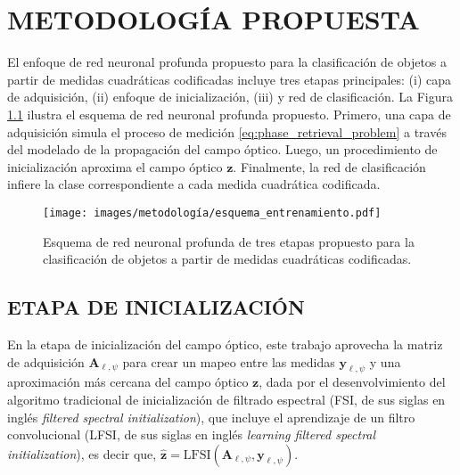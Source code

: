 
\chapter{METODOLOGÍA PROPUESTA}

El enfoque de red neuronal profunda propuesto para la clasificación de objetos a partir de medidas cuadráticas codificadas incluye tres etapas principales: (i) capa de adquisición, (ii) enfoque de inicialización, (iii) y red de clasificación. La Figura \ref{fig:esquema_entrenamiento} ilustra el esquema de red neuronal profunda propuesto. Primero, una capa de adquisición simula el proceso de medición \eqref{eq:phase_retrieval_problem} a través del modelado de la propagación del campo óptico. Luego, un procedimiento de inicialización aproxima el campo óptico $\mathbf{z}$. Finalmente, la red de clasificación infiere la clase correspondiente a cada medida cuadrática codificada.


\begin{figure}[!h]
    \centering
    \caption{Esquema de red neuronal profunda de tres etapas propuesto para la clasificación de objetos a partir de medidas cuadráticas codificadas.}
    \texttt{[image: images/metodología/esquema\_entrenamiento.pdf]}
    \label{fig:esquema_entrenamiento}
\end{figure}


\section{ETAPA DE INICIALIZACIÓN}

En la etapa de inicialización del campo óptico, este trabajo aprovecha la matriz de adquisición $\mathbf{A}_{\ell, \psi}$ para crear un mapeo entre las medidas $\mathbf{y}_{\ell, \psi}$ y una aproximación más cercana del campo óptico $\mathbf{z}$, dada por el desenvolvimiento del algoritmo tradicional de inicialización de filtrado espectral  (FSI, de sus siglas en inglés \textit{filtered spectral initialization}), que incluye el aprendizaje de un filtro convolucional  (LFSI, de sus siglas en inglés \textit{learning filtered spectral initialization}), es decir que, $\hat{\mathbf{z}}=\mathrm{LFSI}(\mathbf{A}_{\ell, \psi}, \mathbf{y}_{\ell, \psi})$.

